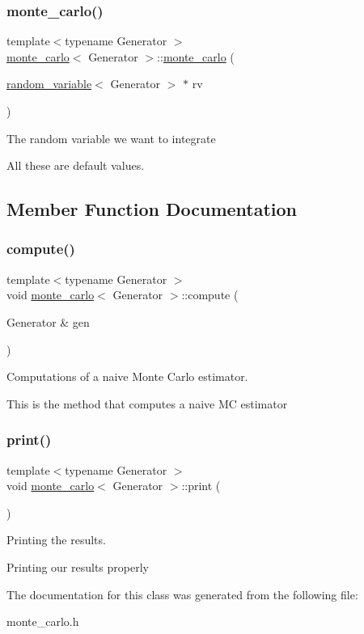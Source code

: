 \subsubsection{\texorpdfstring{monte\+\_\+carlo()}{monte\_carlo()}\hspace{0.1cm}{\footnotesize\ttfamily [2/2]}}
{\footnotesize\ttfamily template$<$typename Generator $>$ \\
\mbox{\hyperlink{classmonte__carlo}{monte\+\_\+carlo}}$<$ Generator $>$\+::\mbox{\hyperlink{classmonte__carlo}{monte\+\_\+carlo}} (\begin{DoxyParamCaption}\item[{\mbox{\hyperlink{classrandom__variable}{random\+\_\+variable}}$<$ Generator $>$ $\ast$}]{rv }\end{DoxyParamCaption})}

The random variable we want to integrate

All these are default values. 

\subsection{Member Function Documentation}
\mbox{\label{classmonte__carlo_a598c1fbac6b56ee278fd04bf6115b1d3}} 
\subsubsection{\texorpdfstring{compute()}{compute()}}
{\footnotesize\ttfamily template$<$typename Generator $>$ \\
void \mbox{\hyperlink{classmonte__carlo}{monte\+\_\+carlo}}$<$ Generator $>$\+::compute (\begin{DoxyParamCaption}\item[{Generator \&}]{gen }\end{DoxyParamCaption})}



Computations of a naive Monte Carlo estimator. 

This is the method that computes a naive MC estimator \mbox{\label{classmonte__carlo_a5fb1de57e0f77deb8ff167589b9e8b9e}} 
\subsubsection{\texorpdfstring{print()}{print()}}
{\footnotesize\ttfamily template$<$typename Generator $>$ \\
void \mbox{\hyperlink{classmonte__carlo}{monte\+\_\+carlo}}$<$ Generator $>$\+::print (\begin{DoxyParamCaption}{ }\end{DoxyParamCaption})}



Printing the results. 

Printing our results properly 

The documentation for this class was generated from the following file\+:\begin{DoxyCompactItemize}
\item 
monte\+\_\+carlo.\+h\end{DoxyCompactItemize}
